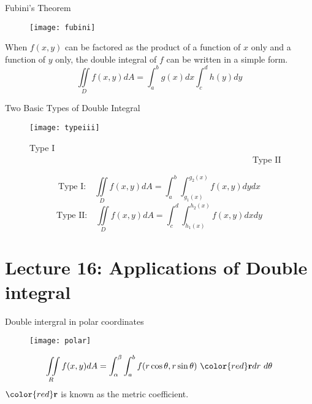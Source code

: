 \documentclass[10pt]{beamer}
\begin{document}
\begin{frame}[allowframebreaks]{Fubini's Theorem}
	\begin{figure}[H]
		\centering
		\texttt{[image: fubini]}
	\end{figure}
	When $f (x, y)$ can be factored as the product of a function of $x$ only and a
	function of $y$ only, the double integral of $f$ can be written in a simple form.
	$$\iint\limits_{D} f(x,y) dA  = \int_{a}^{b} g(x) dx \int_{c}^{d}h(y)dy$$

\end{frame}

\begin{frame}[allowframebreaks]{Two Basic Types of Double Integral}
	\begin{figure}[H]
		\centering
		\texttt{[image: typeiii]}
		\caption{Type I ~~~~~~~~~~~~~~~~~~~~~~~~~~~~~~~~~~~~~~~~~~~~~~~~~~~~Type II}
	\end{figure}
	$$\text{Type I: } ~~~ \iint\limits_D f(x,y)dA = \int_{a}^{b}\int_{g_1(x)}^{g_2(x)}f(x,y)dydx$$
	$$\text{Type II: } ~~~ \iint\limits_D f(x,y)dA = \int_{c}^{d}\int_{h_1(x)}^{h_2(x)}f(x,y)dxdy$$

	
\end{frame}







\section{Lecture 16: Applications of Double integral}

\begin{frame}[allowframebreaks]{Double intergral in polar coordinates}
\begin{figure}[H]
	\centering
	\texttt{[image: polar]}
\end{figure}
$$\iint\limits_R f(x,y)dA = \int_{\alpha}^{\beta}\int_{a}^{b}f(r\cos\theta,r\sin\theta)~{\color{red}\mathbf{r}}dr~d\theta$$
\centering
{$\color{red}\mathbf{r}$} is known as the {\color{red}metric coefficient}.
	
\end{frame}
\end{document}
